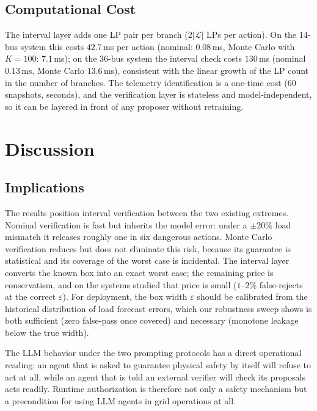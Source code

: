 \documentclass[journal]{IEEEtran}
\begin{document}
\subsection{Computational Cost}
\label{sec:rescost}

The interval layer adds one LP pair per branch ($2|\mathcal{L}|$ LPs per action).
On the 14-bus system this costs $42.7$\,ms per action (nominal: $0.08$\,ms,
Monte Carlo with $K=100$: $7.1$\,ms); on the 36-bus system the interval check
costs $130$\,ms (nominal $0.13$\,ms, Monte Carlo $13.6$\,ms), consistent with
the linear growth of the LP count in the number of branches. The telemetry
identification is a one-time cost (60 snapshots, seconds), and the
verification layer is stateless and model-independent, so it can be layered in
front of any proposer without retraining.

\section{Discussion}
\label{sec:discussion}

\subsection{Implications}

The results position interval verification between the two existing extremes.
Nominal verification is fast but inherits the model error: under a $\pm 20\%$
load mismatch it releases roughly one in six dangerous actions. Monte Carlo
verification reduces but does not eliminate this risk, because its guarantee is
statistical and its coverage of the worst case is incidental. The interval layer
converts the known box into an exact worst case; the remaining price is
conservatism, and on the systems studied that price is small ($1$--$2\%$
false-rejects at the correct $\varepsilon$). For deployment, the box width
$\varepsilon$ should be calibrated from the historical distribution of load
forecast errors, which our robustness sweep shows is both sufficient (zero
false-pass once covered) and necessary (monotone leakage below the true width).

The LLM behavior under the two prompting protocols has a direct operational
reading: an agent that is asked to guarantee physical safety by itself will
refuse to act at all, while an agent that is told an external verifier will
check its proposals acts readily. Runtime authorization is therefore not only a
safety mechanism but a precondition for using LLM agents in grid operations at
all.
\end{document}
